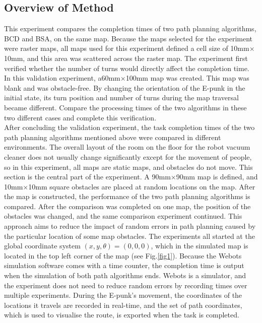 \documentclass[conference]{IEEEtran}
\begin{document}
\subsection{Overview of Method}
This experiment compares the completion times of two path planning algorithms, BCD and BSA, on the same map. Because the maps selected for the experiment were raster maps, all maps used for this experiment defined a cell size of 10mm$\times$10mm, and this area was scattered across the raster map. The experiment first verified whether the number of turns would directly affect the completion time. In this validation experiment, a60mm$\times$100mm map was created. This map was blank and was obstacle-free. By changing the orientation of the E-punk in the initial state, its turn position and number of turns during the map traversal became different. Compare the processing times of the two algorithms in these two different cases and complete this verification.\\
After concluding the validation experiment, the task completion times of the two path planning algorithms mentioned above were compared in different environments. The overall layout of the room on the floor for the robot vacuum cleaner does not usually change significantly except for the movement of people, so in this experiment, all maps are static maps, and obstacles do not move. This section is the central part of the experiment. A 90mm$\times$90mm map is defined, and 10mm$\times$10mm square obstacles are placed at random locations on the map. After the map is constructed, the performance of the two path planning algorithms is compared. After the comparison was completed on one map, the position of the obstacles was changed, and the same comparison experiment continued. This approach aims to reduce the impact of random errors in path planning caused by the particular location of some map obstacles. The experiments all started at the global coordinate system $(x, y, \theta) = (0, 0, 0)$, which in the simulated map is located in the top left corner of the map (see Fig.\ref{fig1}). Because the Webots simulation software comes with a time counter, the completion time is output when the simulation of both path algorithms ends. Webots is a simulator, and the experiment does not need to reduce random errors by recording times over multiple experiments. During the E-punk's movement, the coordinates of the locations it travels are recorded in real-time, and the set of path coordinates, which is used to visualise the route, is exported when the task is completed.
\end{document}
